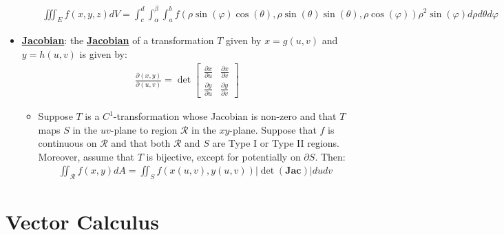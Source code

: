 \documentclass[11pt]{article}
\newcommand{\dfn}[1]{\underline{\textbf{#1}}}
\begin{document}
\begin{itemize}
\begin{itemize}[noitemsep]
		\begin{align}
			\iiint_E f(x,y,z) dV = \int_c^d \int_\alpha^\beta \int_a^b f(\rho \sin (\varphi) \cos (\theta), \rho \sin (\theta) \sin (\theta), \rho \cos (\varphi) ) \rho^2 \sin (\varphi) d \rho d \theta d \varphi 	
		\end{align}
	\end{itemize}
	\item \dfn{Jacobian}: the \dfn{Jacobian} of a transformation $T$ given by $x = g(u,v)$ and $y=h(u,v)$ is given by: 
	\begin{align}
		\frac{\partial (x,y)}{\partial (u,v)} = \det \begin{bmatrix}
			\frac{\partial x}{\partial u} & \frac{\partial x}{\partial v} \\
			\frac{\partial y}{\partial u} & \frac{\partial y}{\partial v}
		\end{bmatrix}	
	\end{align}
	\begin{itemize}[noitemsep]
		\item Suppose $T$ is a $C^1$-transformation whose Jacobian is non-zero and that $T$ maps $S$ in the $uv$-plane to region $\mathcal{R}$ in the $xy$-plane. Suppose that $f$ is continuous on $\mathcal{R}$ and that both $\mathcal{R}$ and $S$ are Type I or Type II regions. Moreover, assume that $T$ is bijective, except for potentially on $\partial S$. Then: 
		\begin{align}
			\iint_{\mathcal{R}} f(x,y) dA = \iint_S f(x(u,v), y(u,v)) | \det (\mathbf{Jac}) | du dv 	
		\end{align}
	\end{itemize}
\end{itemize}

\section{Vector Calculus}
\end{document}
